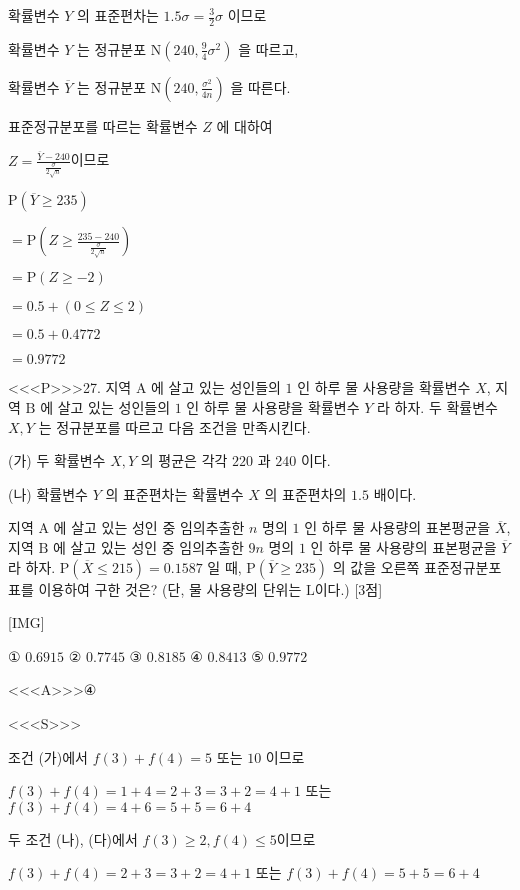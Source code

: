 \documentclass{oblivoir}
\begin{document}
확률변수 $Y$ 의 표준편차는 $1.5 \sigma=\frac{3}{2} \sigma$ 이므로

확률변수 $Y$ 는 정규분포 $\mathrm{N}\left(240, \frac{9}{4} \sigma^{2}\right)$ 을 따르고,

확률변수 $\overline{Y}$ 는 정규분포 $\mathrm{N}\left(240, \frac{\sigma^{2}}{4 n}\right)$ 을 따른다.

표준정규분포를 따르는 확률변수 $Z$ 에 대하여

$Z=\frac{\overline{Y}-240}{\frac{\sigma}{2 \sqrt{n}}}$이므로

$\mathrm{P}(\overline{Y} \geq 235) $

$=\mathrm{P}\left(Z \geq \frac{235-240}{\frac{\sigma}{2 \sqrt{n}}}\right)$

$=\mathrm{P}(Z \geq-2)$

$=0.5+(0 \leq Z \leq 2)$

$=0.5+0.4772$

$=0.9772$


<<<P>>>27. 지역 $\mathrm{A}$ 에 살고 있는 성인들의 $1$ 인 하루 물 사용량을 확률변수 $X$, 지역 $\mathrm{B}$ 에 살고 있는 성인들의 $1$ 인 하루 물 사용량을 확률변수 $Y$ 라 하자. 두 확률변수 $X, Y$ 는 정규분포를 따르고 다음 조건을 만족시킨다.

(가) 두 확률변수 $X, Y$ 의 평균은 각각 $220$ 과 $240$ 이다.

(나) 확률변수 $Y$ 의 표준편차는 확률변수 $X$ 의 표준편차의 $1.5$ 배이다.

지역 $\mathrm{A}$ 에 살고 있는 성인 중 임의추출한 $n$ 명의 $1$ 인 하루 물 사용량의 표본평균을 $\overline{X}$, 지역 $\mathrm{B}$ 에 살고 있는 성인 중 임의추출한 $9 n$ 명의 $1$ 인 하루 물 사용량의 표본평균을 $\overline{Y}$ 라 하자. $\mathrm{P}(\overline{X} \leq 215)=0.1587$ 일 때, $\mathrm{P}(\overline{Y} \geq 235)$ 의 값을 오른쪽 표준정규분포표를 이용하여 구한 것은? (단, 물 사용량의 단위는 $\mathrm{L}$이다.) [3점]

[IMG]

① $0.6915$
② $0.7745$
③ $0.8185$
④ $0.8413$
⑤ $0.9772$



<<<A>>>④

<<<S>>>



조건 (가)에서 $f(3)+f(4)=5$ 또는 $10$ 이므로

$ f(3)+f(4)=1+4=2+3=3+2=4+1$ 또는 $f(3)+f(4)=4+6=5+5=6+4 $

두 조건 (나), (다)에서 $f(3) \geq 2, f(4) \leq 5 $이므로

$f(3)+f(4)=2+3=3+2=4+1$ 또는 $f(3)+f(4)=5+5=6+4$
\end{document}
